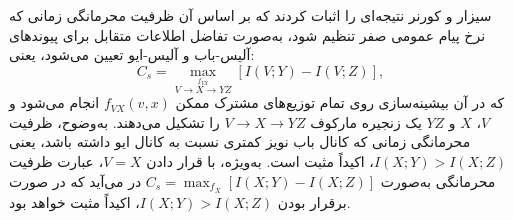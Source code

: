 سیزار و کورنر نتیجه‌ای را اثبات کردند \cite{1-32} که بر اساس آن ظرفیت محرمانگی زمانی که نرخ پیام عمومی صفر تنظیم شود، به‌صورت تفاضل اطلاعات متقابل برای پیوندهای آلیس-باب و آلیس-ایو تعیین می‌شود، یعنی:
\begin{equation}
	C_s = \max_{\stackrel{f_{VX}}{V \to X \to YZ}} [ I(V; Y) - I(V; Z) ],
	\label{eq:1-9}
\end{equation}
که در آن بیشینه‌سازی روی تمام توزیع‌های مشترک ممکن $f_{VX}(v, x)$ انجام می‌شود و $V$، $X$ و $YZ$ یک زنجیره مارکوف $V \to X \to YZ$ را تشکیل می‌دهند. به‌وضوح، ظرفیت محرمانگی زمانی که کانال باب نویز کمتری نسبت به کانال ایو داشته باشد، یعنی $I(X; Y) > I(X; Z)$، اکیداً مثبت است. به‌ویژه، با قرار دادن $V = X$، عبارت ظرفیت محرمانگی به‌صورت $C_s = \max_{f_X} [ I(X; Y) - I(X; Z) ]$ در می‌آید که در صورت برقرار بودن $I(X; Y) > I(X; Z)$، اکیداً مثبت خواهد بود.
